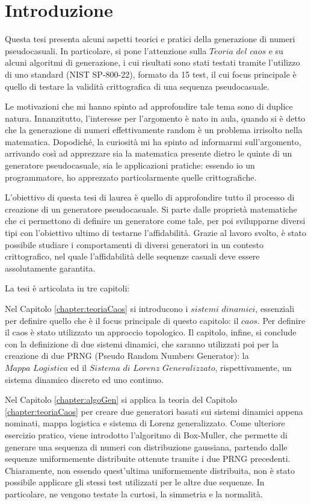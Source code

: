 \chapter{Introduzione}
Questa tesi presenta alcuni aspetti teorici e pratici della generazione di numeri pseudocasuali. 
In particolare, si pone l'attenzione sulla $\textit{Teoria del caos}$ e su alcuni algoritmi di generazione, i cui risultati sono stati testati tramite l'utilizzo di uno standard (NIST SP-800-22), formato da 15 test, il cui focus principale è quello di testare la validità crittografica di una sequenza pseudocasuale.

Le motivazioni che mi hanno spinto ad approfondire tale tema sono di duplice natura.
Innanzitutto, l'interesse per l'argomento è nato in aula, quando si è detto che la generazione di numeri effettivamente random è un problema irrisolto nella matematica.
Dopodiché, la curiosità mi ha spinto ad informarmi sull'argomento, arrivando così ad apprezzare sia la matematica presente dietro le quinte di un generatore pseudocasuale, sia le applicazioni pratiche: essendo io un programmatore, ho apprezzato particolarmente quelle crittografiche.

L'obiettivo di questa tesi di laurea è quello di approfondire tutto il processo di creazione di un generatore pseudocasuale. 
Si parte dalle proprietà matematiche che ci permettono di definire un generatore come tale, per poi svilupparne diversi tipi con l'obiettivo ultimo di testarne l'affidabilità. Grazie al lavoro svolto, è stato possibile studiare i comportamenti di diversi generatori in un contesto crittografico, nel quale l'affidabilità delle sequenze casuali deve essere assolutamente garantita.

La tesi è articolata in tre capitoli: 

Nel Capitolo \ref{chapter:teoriaCaos} si introducono i $\textit{sistemi dinamici}$, essenziali per definire quello che è il focus principale di questo capitolo: il $\textit{caos}$.
Per definire il caos è stato utilizzato un approccio topologico.
Il capitolo, infine, si conclude con la definizione di due sistemi dinamici, che saranno utilizzati poi per la creazione di due PRNG (Pseudo Random Numbers Generator): la $\textit{Mappa Logistica}$ ed il $\textit{Sistema di Lorenz Generalizzato}$, rispettivamente, un sistema dinamico discreto ed uno continuo.

Nel Capitolo \ref{chapter:algoGen} si applica la teoria del Capitolo \ref{chapter:teoriaCaos} per creare due generatori basati sui sistemi dinamici appena nominati, mappa logistica e sistema di Lorenz generalizzato.
Come ulteriore esercizio pratico, viene introdotto l'algoritmo di Box-Muller, che permette di generare una sequenza di numeri con distribuzione gaussiana, partendo dalle sequenze uniformemente distribuite ottenute tramite i due PRNG precedenti. 
Chiaramente, non essendo quest'ultima uniformemente distribuita, non è stato possibile applicare gli stessi test utilizzati per le altre due sequenze.
In particolare, ne vengono testate la curtosi, la simmetria e la normalità. 


